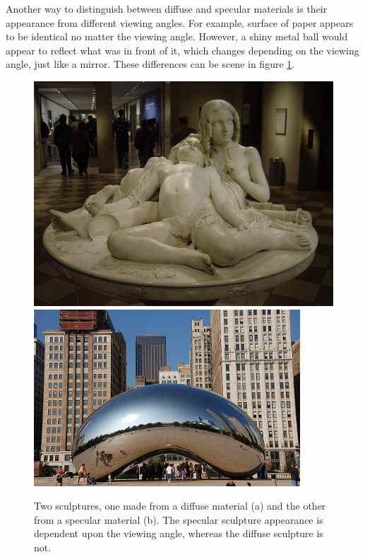 \documentclass[../dissertation.tex]{subfiles}
\begin{document}
Another way to distinguish between diffuse and specular materials is their appearance from different viewing angles. For example, surface of paper appears to be identical no matter the viewing angle. However, a shiny metal ball would appear to reflect what was in front of it, which changes depending on the viewing angle, just like a mirror. These differences can be scene in figure \ref{fig:material_pics}.

\begin{figure}[h]
\centering
{}
  \includegraphics[width=\textwidth]{images/diffuse_sculpture.jpeg}   
\endminipage\hspace{5em}
  \includegraphics[width=\textwidth]{images/specular_sculpture.jpg}
\endminipage
\caption{Two sculptures, one made from a diffuse material (a) and the other from a specular material (b). The specular sculpture appearance is dependent upon the viewing angle, whereas the diffuse sculpture is not.}
\label{fig:material_pics}
\end{figure}
\end{document}
